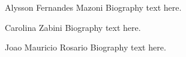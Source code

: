 \documentclass[journal]{IEEEtran}
\begin{document}

% 

\begin{IEEEbiography}{Alysson Fernandes Mazoni}
Biography text here.
\end{IEEEbiography}

\begin{IEEEbiographynophoto}{Carolina Zabini}
Biography text here.
\end{IEEEbiographynophoto}


\begin{IEEEbiographynophoto}{Joao Mauricio Rosario}
Biography text here.
\end{IEEEbiographynophoto}



\end{document}
